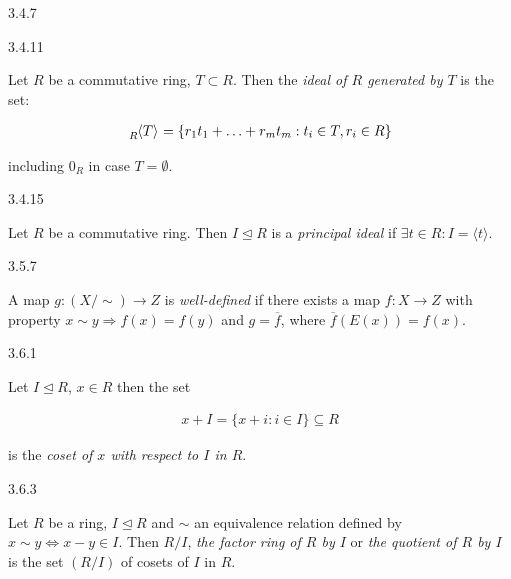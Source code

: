 \documentclass[10pt]{article} %
\begin{document}
\begin{multicols}{3}
\begin{definition}{3.4.7}{}
\end{definition}

\begin{definition}{3.4.11}{}

    Let $R$ be a commutative ring, $T \subset R$. Then the \emph{ideal of $R$ generated by $T$} is the set:

        \begin{align*}
            \tensor[_R]{\langle T \rangle}{} = \{r_1t_1 + \hdots + r_mt_m : t_i \in T, r_i \in R\}
        \end{align*}

    including $0_R$ in case $T = \emptyset$.

\end{definition}

\begin{definition}{3.4.15}{}

    Let $R$ be a commutative ring. Then $I \unlhd R$ is a \emph{principal ideal} if $\exists t \in R: I = \langle t \rangle$.

\end{definition}

\begin{definition}{3.5.7}{}

    A map $g: (X/\sim) \to Z$ is \emph{well-defined} if there exists a map $f: X \to Z$ with property $x \sim y \Rightarrow f(x) = f(y)$ and $g = \overline{f}$, where $\overline{f}(E(x)) = f(x)$.

\end{definition}

\begin{definition}{3.6.1}{}

    Let $I \unlhd R$, $x \in R$ then the set

        \begin{align*}
            x + I = \{x + i: i \in I \} \subseteq R
        \end{align*}

    is the \emph{coset of $x$ with respect to $I$ in $R$}.

\end{definition}

\begin{definition}{3.6.3}{}

    Let $R$ be a ring, $I \unlhd R$ and $\sim$ an equivalence relation defined by $x \sim y \Leftrightarrow x - y \in I$. Then $R/I$, \emph{the factor ring of $R$ by $I$} or \emph{the quotient of $R$ by $I$} is the set $(R/I)$ of cosets of $I$ in $R$.


\end{definition}
\end{multicols}
\end{document}
